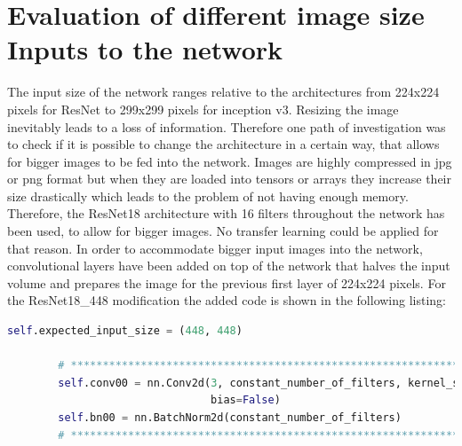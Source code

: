 \begin{table}[!h] \centering
{}
\caption{Resnet18 NineCrop implementation with and without pre-training. FINAL (regular) means ResNet18 with the resizing of the image instead of cropping and averaging}
\label{tbl:resnet18-randomnine}
\end{table}



\section{Evaluation of different image size Inputs to the network}

The input size of the network ranges relative to the architectures from 224x224 pixels for ResNet to 299x299 pixels for inception v3. Resizing the image inevitably leads to a loss of information. Therefore one path of investigation was to check if it is possible to change the architecture in a certain way, that allows for bigger images to be fed into the network. Images are highly compressed in jpg or png format but when they are loaded into tensors or arrays they increase their size drastically which leads to the problem of not having enough memory. Therefore, the ResNet18 architecture with 16 filters throughout the network has been used, to allow for bigger images. No transfer learning could be applied for that reason. In order to accommodate bigger input images into the network, convolutional layers have been added on top of the network that halves the input volume and prepares the image for the previous first layer of 224x224 pixels. For the ResNet18\_448 modification the added code is shown in the following listing:

\begin{minipage}{\linewidth}
\begin{lstlisting}[language=Python, caption=Python example, basicstyle=\tiny]
        self.expected_input_size = (448, 448)

        # ************************************************************************************************
        self.conv00 = nn.Conv2d(3, constant_number_of_filters, kernel_size=7, stride=2, padding=3,
                                bias=False)
        self.bn00 = nn.BatchNorm2d(constant_number_of_filters)
        # ************************************************************************************************
\end{lstlisting}
\end{minipage}

